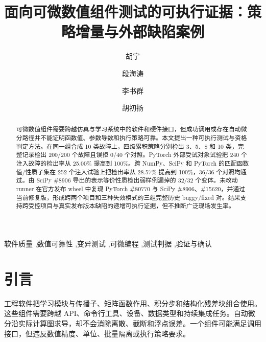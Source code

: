 \documentclass[preprint,12pt,authoryear]{elsarticle}
\begin{document}
\begin{frontmatter}
\title{面向可微数值组件测试的可执行证据：策略增量与外部缺陷案例}
\author[mech]{胡宁}
\author[cs]{段海涛}
\author[math]{李书群}
\author[ucsc]{胡初扬}
\address[mech]{School of Mechanical Engineering, Hangzhou Dianzi University, No. 1158, 2nd Street, Qiantang District, Hangzhou 310018, Zhejiang, China}
\address[cs]{School of Computer Science, Hangzhou Dianzi University, No. 1158, 2nd Street, Qiantang District, Hangzhou 310018, Zhejiang, China}
\address[math]{School of Mathematics and Physics, Xi'an Jiaotong--Liverpool University, 111 Ren'ai Road, Suzhou Industrial Park, Suzhou 215123, Jiangsu, China}
\address[ucsc]{Department of Computer Science and Engineering, University of California, 1156 High Street, Santa Cruz, CA 95064, USA}

\begin{abstract}
可微数值组件需要跨越仿真与学习系统中的软件和硬件接口，但成功调用或存在自动微分路径并不能证明函数值、参数导数和执行策略可靠。本文提出一种可执行测试与资格判定方法。在同一组合成 10 类故障上，四级累积策略分别检出 3、5、8 和 10 类，完整记录检出 200/200 个故障且误拒 0/40 个对照。PyTorch 外部受试对象试验把 240 个注入故障的检出率从 25.00\% 提高到 100\%。跨 NumPy、SciPy 和 PyTorch 的匹配函数值/性质子集在 252 个注入试验上把检出率从 28.57\% 提高到 100\%，36/36 个对照均通过。由 SciPy \#8906 导出的表示等价性质检出弱样例漏掉的 32/32 个变体。未改动 runner 在官方发布 wheel 中复现 PyTorch \#80770 与 SciPy \#8906、\#15620，并通过当前修复版，形成跨两个项目和三种失效模式的三组完整历史 buggy/fixed 对。结果支持跨受控项目与真实发布版本缺陷的递增可执行证据，但不推断广泛现场发生率。
\end{abstract}
\begin{keyword}
软件质量 \sep 数值可靠性 \sep 变异测试 \sep 可微编程 \sep 测试判据 \sep 验证与确认
\end{keyword}
\end{frontmatter}

\section{引言}
工程软件把学习模块与传播子、矩阵函数作用、积分步和结构化残差块组合使用。这些组件需要跨越 API、命令行工具、设备、数据类型和持续集成任务。自动微分沿实际计算图求导，却不会消除离散、截断和浮点误差。一个组件可能满足调用接口，但违反数值精度、单位、批量隔离或执行策略要求。
\end{document}
